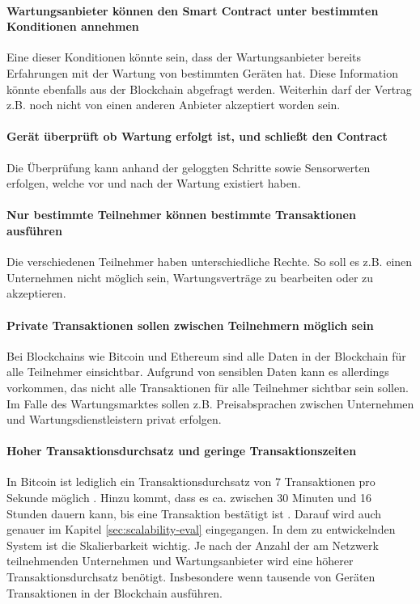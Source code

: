 \paragraph{Wartungsanbieter können den Smart Contract unter bestimmten Konditionen annehmen}
Eine dieser Konditionen könnte sein, dass der Wartungsanbieter bereits Erfahrungen mit der Wartung von bestimmten Geräten hat. Diese Information könnte ebenfalls aus der Blockchain abgefragt werden. Weiterhin darf der Vertrag z.B. noch nicht von einen anderen Anbieter akzeptiert worden sein. 

\paragraph{Gerät überprüft ob Wartung erfolgt ist, und schließt den Contract}
Die Überprüfung kann anhand der geloggten Schritte sowie Sensorwerten erfolgen, welche vor und nach der Wartung existiert haben.

\paragraph{Nur bestimmte Teilnehmer können bestimmte Transaktionen ausführen}
Die verschiedenen Teilnehmer haben unterschiedliche Rechte. So soll es z.B. einen Unternehmen nicht möglich sein, Wartungsverträge zu bearbeiten oder zu akzeptieren.

\paragraph{Private Transaktionen sollen zwischen Teilnehmern möglich sein}
Bei Blockchains wie Bitcoin und Ethereum sind alle Daten in der Blockchain für alle Teilnehmer einsichtbar. Aufgrund von sensiblen Daten kann es allerdings vorkommen, das nicht alle Transaktionen für alle Teilnehmer sichtbar sein sollen. Im Falle des Wartungsmarktes sollen z.B. Preisabsprachen zwischen Unternehmen und Wartungsdienstleistern privat erfolgen.

\paragraph{Hoher Transaktionsdurchsatz und geringe Transaktionszeiten}
In Bitcoin ist lediglich ein Transaktionsdurchsatz von 7 Transaktionen pro Sekunde möglich \cite{ZhengBlockchainChallengesOpportunities2017}. Hinzu kommt, dass es ca. zwischen 30 Minuten und 16 Stunden dauern kann, bis eine Transaktion bestätigt ist \cite{BuchkoHowLongBitcoin2017}. Darauf wird auch genauer im Kapitel \ref{sec:scalability-eval} eingegangen. In dem zu entwickelnden System ist die Skalierbarkeit wichtig. Je nach der Anzahl der am Netzwerk teilnehmenden Unternehmen und Wartungsanbieter wird eine höherer Transaktionsdurchsatz benötigt. Insbesondere wenn tausende von Geräten Transaktionen in der Blockchain ausführen.

